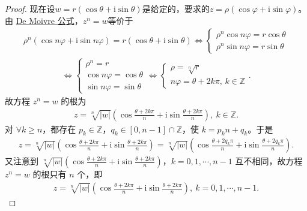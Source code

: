 \documentclass[../../main.tex]{subfiles}%
\begin{document}
\begin{proof}
现在设\(w = r(\cos\theta + \mathrm{i}\sin\theta)\)是给定的，要求的\(z = \rho(\cos\varphi + \mathrm{i}\sin\varphi)\)。由 \hyperref[theorem:De Moivre公式]{De Moivre 公式}，\(z^n = w\)等价于
\begin{align*}
\rho^n(\cos n\varphi + \mathrm{i}\sin n\varphi) = r(\cos \theta + \mathrm{i}\sin \theta)
\Longleftrightarrow
\begin{cases}
\rho^n\cos n\varphi = r\cos \theta \\
\rho^n\sin n\varphi = r\sin \theta
\end{cases}
\end{align*}
\begin{align*}
\Longleftrightarrow
\begin{cases}
\rho^n = r \\
\cos n\varphi = \cos \theta \\
\sin n\varphi = \sin \theta
\end{cases}
\Longleftrightarrow
\begin{cases}
\rho = \sqrt[n]{r} \\
n\varphi = \theta + 2k\pi,\, k\in \mathbb{Z}
\end{cases}.
\end{align*}
故方程 $z^n = w$ 的根为
\begin{align*}
z = \sqrt[n]{|w|}\left( \cos \frac{\theta + 2k\pi}{n} + \mathrm{i}\sin \frac{\theta + 2k\pi}{n} \right),\ k\in \mathbb{Z}.
\end{align*}
对 $\forall k \geqslant n$，都存在 $p_k \in \mathbb{Z}$，$q_k \in [0,n-1] \cap \mathbb{Z}$，使 $k = p_kn + q_k$。于是
\begin{align*}
z = \sqrt[n]{|w|}\left( \cos \frac{\theta + 2k\pi}{n} + \mathrm{i}\sin \frac{\theta + 2k\pi}{n} \right) = \sqrt[n]{|w|}\left( \cos \frac{\theta + 2q_k\pi}{n} + \mathrm{i}\sin \frac{\theta + 2q_k\pi}{n} \right).
\end{align*}
又注意到 $\sqrt[n]{|w|}\left( \cos \frac{\theta + 2k\pi}{n} + \mathrm{i}\sin \frac{\theta + 2k\pi}{n} \right)$，$k=0,1,\cdots,n-1$ 互不相同，故方程 $z^n = w$ 的根只有 $n$ 个，即
\begin{align*}
z = \sqrt[n]{|w|}\left( \cos \frac{\theta + 2k\pi}{n} + \mathrm{i}\sin \frac{\theta + 2k\pi}{n} \right),\ k=0,1,\cdots,n-1.
\end{align*}

\end{proof}
\end{document}
